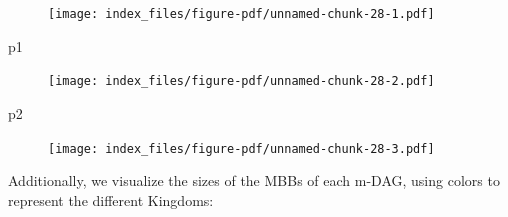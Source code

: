 \documentclass[
  letterpaper,
  DIV=11,
  numbers=noendperiod]{scrreprt}
\newenvironment{Shaded}{}{}
\newcommand{\NormalTok}[1]{\textcolor[rgb]{0.67,0.70,0.75}{#1}}
\begin{document}
\begin{figure}[H]

{\centering \texttt{[image: index\_files/figure-pdf/unnamed-chunk-28-1.pdf]}

}

\end{figure}

\begin{Shaded}
\begin{Highlighting}[]
\NormalTok{p1}
\end{Highlighting}
\end{Shaded}

\begin{figure}[H]

{\centering \texttt{[image: index\_files/figure-pdf/unnamed-chunk-28-2.pdf]}

}

\end{figure}

\begin{Shaded}
\begin{Highlighting}[]
\NormalTok{p2}
\end{Highlighting}
\end{Shaded}

\begin{figure}[H]

{\centering \texttt{[image: index\_files/figure-pdf/unnamed-chunk-28-3.pdf]}

}

\end{figure}

Additionally, we visualize the sizes of the MBBs of each m-DAG, using
colors to represent the different Kingdoms:
\end{document}
